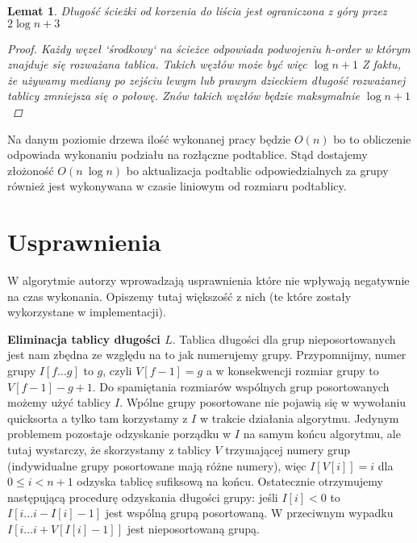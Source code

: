 \documentclass[12pt]{article}
\newtheorem*{lemma}{Lemat}
\begin{document}
\begin{lemma}
Długość ścieżki od korzenia do liścia jest ograniczona z góry przez $2 \log{n} + 3$
\begin{proof}
Każdy węzeł `środkowy` na ścieżce odpowiada podwojeniu \textit{h-order} w którym znajduje się rozważana tablica. Takich węzłów może być więc $\log{n} + 1$ Z faktu, że używamy mediany po zejściu lewym lub prawym dzieckiem długość rozważanej tablicy zmniejsza się o połowę. Znów takich węzłów będzie maksymalnie $\log{n} + 1$
\end{proof}
\end{lemma}
Na danym poziomie drzewa ilość wykonanej pracy będzie $O(n)$ bo to obliczenie odpowiada wykonaniu podziału na rozłączne podtablice. Stąd dostajemy złożoność $O(n\ \log{n})$ bo aktualizacja podtablic odpowiedzialnych za grupy również jest wykonywana w czasie liniowym od rozmiaru podtablicy.

\section*{Usprawnienia}

W algorytmie autorzy wprowadzają usprawnienia które nie wpływają negatywnie na czas wykonania. Opiszemy tutaj większość z nich (te które zostały wykorzystane w implementacji).

\textbf{Eliminacja tablicy długości $L$}. Tablica długości dla grup nieposortowanych jest nam zbędna ze względu na to jak numerujemy grupy. Przypomnijmy, numer grupy $I[f \ldots g]$ to $g$, czyli $V[f-1] = g$ a w konsekwencji rozmiar grupy to $V[f-1] - g + 1$. Do spamiętania rozmiarów wspólnych grup posortowanych możemy użyć tablicy $I$. Wpólne grupy posortowane nie pojawią się w wywołaniu quicksorta a tylko tam korzystamy z $I$ w trakcie działania algorytmu. Jedynym problemem pozostaje odzyskanie porządku w $I$ na samym końcu algorytmu, ale tutaj wystarczy, że skorzystamy z tablicy $V$ trzymającej numery grup (indywidualne grupy posortowane mają różne numery), więc $I[V[i]] = i$ dla $0 \leq i < n+1$ odzyska tablicę sufiksową na końcu. Ostatecznie otrzymujemy następującą procedurę odzyskania długości grupy: jeśli $I[i] < 0$ to $I[i \ldots i - I[i] - 1]$ jest wspólną grupą posortowaną. W przeciwnym wypadku $I[i \ldots i + V[I[i]-1]]$ jest nieposortowaną grupą. 
\end{document}
